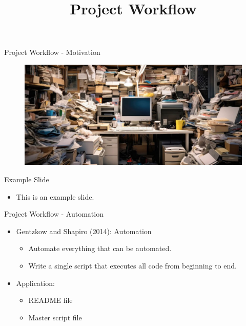 \documentclass{beamer}
\title[]{Project Workflow}
\date{}
\begin{document}
\maketitle

\beamertemplatenavigationsymbolsempty
\begin{frame}{Project Workflow - Motivation}
    \begin{figure}
        \includegraphics[scale=0.35]{clutter.jpeg}
    \end{figure}      
\end{frame}

\begin{frame}{Example Slide}
    \begin{itemize}
        \item This is an example slide.
    \end{itemize}
\end{frame}

\begin{frame}{Project Workflow - Automation}
    \begin{itemize}
        \item Gentzkow and Shapiro (2014): Automation
            \begin{itemize}
                \item Automate everything that can be automated.
                \item Write a single script that executes all code from beginning to end.
            \end{itemize}
        \bigskip
        \item Application:
            \begin{itemize}
                \item README file
                \item Master script file
            \end{itemize}
    \end{itemize}
\end{frame}
\end{document}
